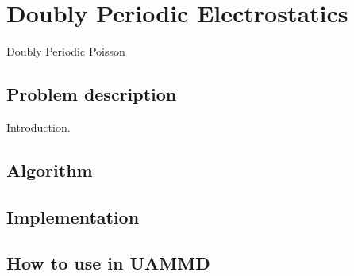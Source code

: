 \chapter{Doubly Periodic Electrostatics}\label{ch:dppoisson}
Doubly Periodic Poisson
\section{Problem description}
Introduction.
\section{Algorithm}

\section{Implementation}

\section{How to use in UAMMD}


